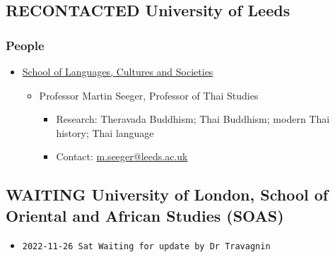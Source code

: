 \documentclass[11pt]{article}
\begin{document}
\subsection*{{\bfseries\sffamily RECONTACTED} University of Leeds}
\label{sec:orge34af5b}
\subsubsection*{People}
\label{sec:org097e651}
\begin{itemize}
\item \href{https://ahc.leeds.ac.uk/languages}{School of Languages, Cultures and Societies}
\label{sec:orgeb443d6}
\begin{itemize}
\item Professor Martin Seeger, Professor of Thai Studies
\label{sec:org7897f6e}
\begin{itemize}
\item Research: Theravada Buddhism; Thai Buddhism; modern Thai history; Thai language\\
\item Contact: \href{mailto:m.seeger@leeds.ac.uk}{m.seeger@leeds.ac.uk}\\
\end{itemize}
\end{itemize}
\end{itemize}
\subsection*{{\bfseries\sffamily WAITING} University of London, School of Oriental and African Studies (SOAS)}
\label{sec:orgba49e79}
\begin{itemize}
\item \texttt{2022-11-26 Sat Waiting for update by Dr Travagnin}\\
\end{itemize}
\end{document}
